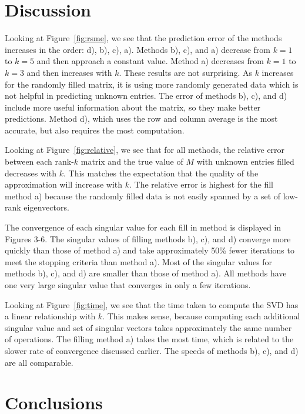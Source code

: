 \documentclass[11pt]{article} %
\begin{document}
\section{Discussion}

Looking at Figure~\ref{fig:rsme}, we see that the prediction error of the methods increases in the order: d), b), c), a). Methods b), c), and a) decrease from $k=1$ to $k =5$ and then approach a constant value. Method a)  decreases from $k=1$ to $k=3$ and then increases with $k$. These results are not surprising. As $k$ increases for the randomly filled matrix, it is using more randomly generated data which is not helpful in predicting unknown entries. The error of methods b), c), and d) include more useful information about the matrix, so they make better predictions. Method d), which uses the row and column average is the most accurate, but also requires the most computation.

Looking at Figure~\ref{fig:relative}, we see that for all methods, the  relative error between each rank-$k$ matrix and the true value of $M$ with unknown entries filled decreases with $k$. This matches the expectation that the quality of the approximation will increase with $k$. The relative error is highest for the fill method a) because the randomly filled data is not easily spanned by a set of low-rank eigenvectors.

The convergence of each singular value for each fill in method is displayed in Figures 3-6. The singular values of filling methods b), c), and d) converge more quickly than those of method a) and take approximately 50\% fewer iterations to meet the stopping criteria than method a). Most of the singular values for methods b), c), and d) are smaller than those of method a). All methods have one very large singular value that converges in only a few iterations.

Looking at Figure~\ref{fig:time}, we see that the time taken to compute the SVD has a linear relationship with $k$. This makes sense, because computing each additional singular value and set of singular vectors takes approximately the same number of operations. The filling method a) takes the most time, which  is related to the slower rate of convergence discussed earlier. The speeds of methods b), c), and d) are all comparable.

\section{Conclusions}
\end{document}
